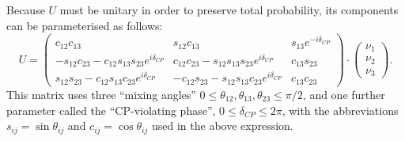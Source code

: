 Because $U$ must be unitary in order to preserve total probability, its components can be parameterised as follows:
\begin{equation}
    U = 
    \begin{pmatrix}
        c_{12}c_{13} & s_{12}c_{13} & s_{13}e^{-i\delta_{CP}} \\
        -s_{12}c_{23}-c_{12}s_{13}s_{23}e^{i\delta_{CP}} & c_{12}c_{23}-s_{12}s_{13}s_{23}e^{i\delta_{CP}} & c_{13}s_{23} \\
        s_{12}s_{23}-c_{12}s_{13}c_{23}e^{i\delta_{CP}} & -c_{12}s_{23}-s_{12}s_{13}c_{23}e^{i\delta_{CP}} & c_{13}c_{23} 
    \end{pmatrix} \cdot 
     \begin{pmatrix}
        \nu_{1} \\ \nu_{2} \\ \nu_{3}
    \end{pmatrix}.
\end{equation}
This matrix uses three ``mixing angles'' $0\leq \theta_{12},\theta_{13},\theta_{23}\leq \pi/2$, and one further parameter called the ``CP-violating phase'', $0\leq\delta_{CP}\leq2\pi$, with the abbreviations $s_{ij}=\sin{\theta_{ij}}$ and $c_{ij}=\cos{\theta_{ij}}$ used in the above expression.

